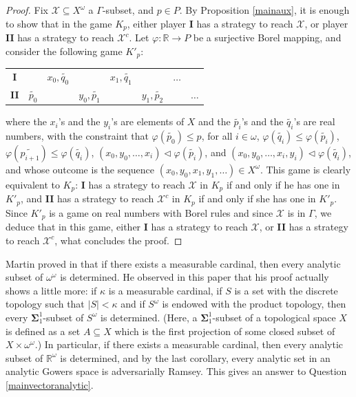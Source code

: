 \documentclass[a4paper,11pt]{article}
\theoremstyle{definition}
\numberwithin{equation}{section}
\newcommand{\R}{\mathbb{R}}
\newcommand{\X}{\mathcal{X}}
\newcommand{\I}{\textbf{I}}
\newcommand{\II}{\textbf{II}}
\begin{document}
\begin{proof}

Fix $\X \subseteq X^\omega$ a $\Gamma$-subset, and $p \in P$. By Proposition \ref{mainaux}, it is enough to show that in the game $K_p$, either player \I{} has a strategy to reach $\X$, or player \II{} has a strategy to reach $\X^c$. Let $\varphi : \R \longrightarrow P$ be a surjective Borel mapping, and consider the following game $K'_p$:

\smallskip

\begin{tabular}{cccccccc}
\textbf{I} & & $x_0,  \widetilde{q_0}$ & & $x_1,  \widetilde{q_1}$ & & $\hdots$ \\
\textbf{II} & $\widetilde{p_0}$ & & $y_0,  \widetilde{p_1}$ & & $y_1,  \widetilde{p_2}$ & & $\hdots$ 
\end{tabular}

\smallskip

\noindent where the $x_i$'s and the $y_i$'s are elements of $X$ and the $\widetilde{p_i}$'s and the $\widetilde{q_i}$'s are real numbers, with the constraint that $\varphi(\widetilde{p_0}) \leqslant p$, for all $i \in \omega$, $\varphi(\widetilde{q_i}) \leqslant \varphi(\widetilde{p_i})$, $\varphi(\widetilde{p_{i + 1}}) \leqslant \varphi(\widetilde{q_i})$, $(x_0, y_0, \ldots, x_i) \vartriangleleft \varphi(\widetilde{p_i})$, and $(x_0, y_0, \ldots, x_i, y_i) \vartriangleleft \varphi(\widetilde{q_i})$, and whose outcome is the sequence $(x_0, y_0, x_1, y_1, \ldots) \in X^\omega$. This game is clearly equivalent to $K_p$: \I{} has a strategy to reach $\X$ in $K_p$ if and only if he has one in $K'_p$, and \II{} has a strategy to reach $\X^c$ in $K_p$ if and only if she has one in $K'_p$. Since $K'_p$ is a game on real numbers with Borel rules and since $\X$ is in $\Gamma$, we deduce that in this game, either \I{} has a strategy to reach $\X$, or \II{} has a strategy to reach $\X^c$, what concludes the proof.

\end{proof}

Martin proved in \cite{MartinMeasurable} that if there exists a measurable cardinal, then every analytic subset of $\omega^\omega$ is determined. He observed in this paper that his proof actually shows a little more: if $\kappa$ is a measurable cardinal, if $S$ is a set with the discrete topology such that $|S| < \kappa$ and if $S^\omega$ is endowed with the product topology, then every $\mathbf{\Sigma}_1^1$-subset of $S^\omega$ is determined. (Here, a $\mathbf{\Sigma}_1^1$-subset of a topological space $X$ is defined as a set $A \subseteq X$ which is the first projection of some closed subset of $X \times \omega^\omega$.) In particular, if there exists a measurable cardinal, then every analytic subset of $\R^\omega$ is determined, and by the last corollary, every analytic set in an analytic Gowers space is adversarially Ramsey. This gives an answer to Question \ref{mainvectoranalytic}.
\end{document}
